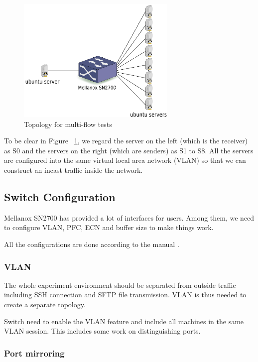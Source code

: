 \documentclass[12pt,a4paper]{article}
\begin{document}
\begin{figure}[ht]
	\begin{center}
		\includegraphics[width=3in]{Topology}
		\caption{Topology for multi-flow tests}
		\label{fig:Topology}
	\end{center}
\end{figure}

To be clear in Figure ~\ref{fig:Topology},
we regard the server on the left (which is the receiver) as S0 and the servers on the right (which are senders) as S1 to S8.
All the servers are configured into the same virtual local area network (VLAN) so that we can construct an incast traffic inside the network.

\subsection{Switch Configuration}

Mellanox SN2700 has provided a lot of interfaces for users.
Among them, we need to configure VLAN, PFC, ECN and buffer size to make things work.

All the configurations are done according to the manual \cite{sn2700}.

\subsubsection{VLAN}
The whole experiment environment should be separated from outside traffic including SSH connection and SFTP file transmission.
VLAN is thus needed to create a separate topology.

Switch need to enable the VLAN feature and include all machines in the same VLAN session.
This includes some work on distinguishing ports.

\subsubsection{Port mirroring}
\end{document}
